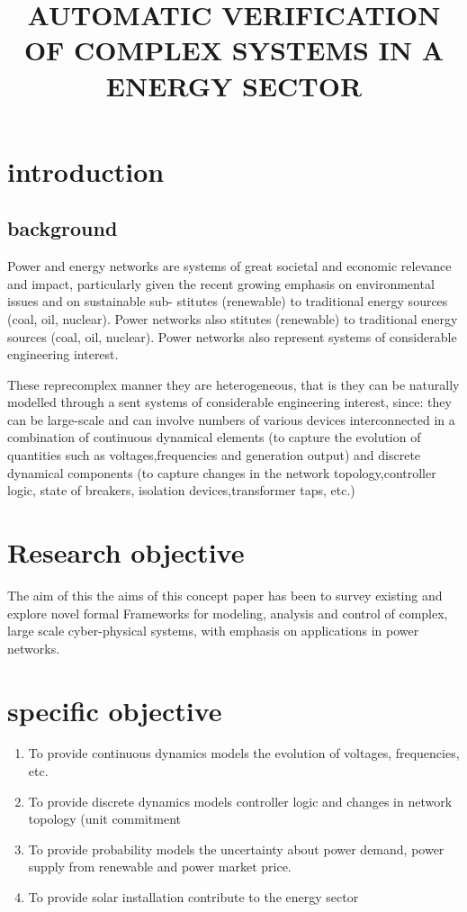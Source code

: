 \documentclass[11pt]{article}
\title{AUTOMATIC VERIFICATION OF COMPLEX SYSTEMS IN A ENERGY SECTOR}
\begin{document}
\section{introduction}
\subsection{background}

Power and energy networks are systems of great societal and economic relevance and impact, particularly given the recent growing emphasis on environmental issues and on sustainable sub- stitutes (renewable) to traditional energy sources (coal, oil, nuclear). Power networks also stitutes (renewable) to traditional energy sources (coal, oil, nuclear). Power networks also represent systems of considerable engineering interest.
\space
\newline

These reprecomplex manner they are heterogeneous, that is they can be naturally modelled through a sent systems of considerable engineering interest, since: they can be large-scale and can involve numbers of various devices interconnected in a combination of continuous dynamical elements (to capture the evolution of quantities such as voltages,frequencies and generation output) and discrete dynamical components (to capture changes in the network topology,controller logic, state of breakers, isolation devices,transformer taps, etc.)

\section{Research objective}
The aim of this the aims of this concept paper has been to survey existing and explore novel formal Frameworks for modeling, analysis and control of complex, large scale cyber-physical systems, with emphasis on applications in power networks.
\section{specific objective}
\begin{enumerate}
\item 	To provide continuous dynamics models the evolution of voltages, frequencies, etc.
\item 	To provide discrete dynamics models controller logic and changes in network topology (unit commitment
\item 	To provide probability models the uncertainty about power demand, power supply from renewable and power market price.
\item  To provide solar installation contribute to the energy sector
\end{enumerate}
\end{document}
